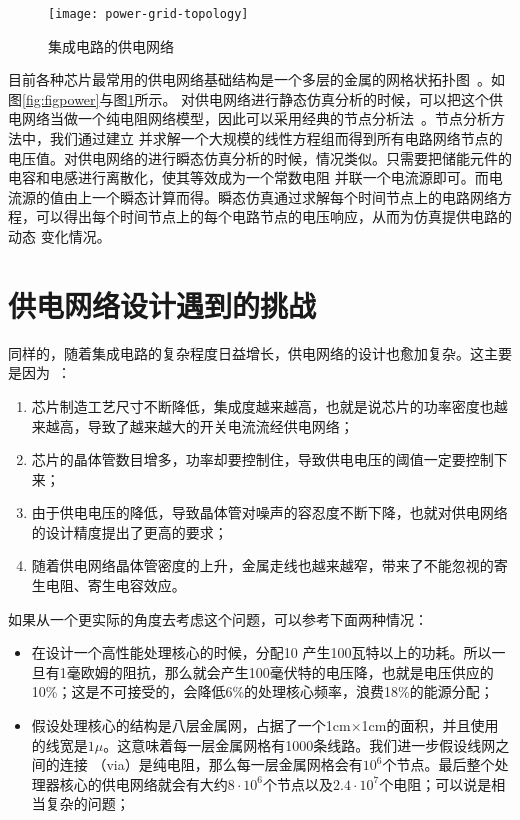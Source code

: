 \begin{figure}[H] %
  \centering
  \texttt{[image: power-grid-topology]}
  \caption{集成电路的供电网络}
  \label{fig:figtopology}
\end{figure}

目前各种芯片最常用的供电网络基础结构是一个多层的金属的网格状拓扑图~\cite{popovich2007power}。如图\ref{fig:figpower}与图\ref{fig:figtopology}所示。
对供电网络进行静态仿真分析的时候，可以把这个供电网络当做一个纯电阻网络模型，因此可以采用经典的节点分析法~\cite{vlach1983computer}。节点分析方法中，我们通过建立
并求解一个大规模的线性方程组而得到所有电路网络节点的电压值。对供电网络的进行瞬态仿真分析的时候，情况类似。只需要把储能元件的电容和电感进行离散化，使其等效成为一个常数电阻
并联一个电流源即可。而电流源的值由上一个瞬态计算而得。瞬态仿真通过求解每个时间节点上的电路网络方程，可以得出每个时间节点上的每个电路节点的电压响应，从而为仿真提供电路的动态
变化情况。


\section{供电网络设计遇到的挑战}

同样的，随着集成电路的复杂程度日益增长，供电网络的设计也愈加复杂。这主要是因为~\cite{zhu2004power}：
\begin{enumerate}
    \item 芯片制造工艺尺寸不断降低，集成度越来越高，也就是说芯片的功率密度也越来越高，导致了越来越大的开关电流流经供电网络；
    \item 芯片的晶体管数目增多，功率却要控制住，导致供电电压的阈值一定要控制下来；
    \item 由于供电电压的降低，导致晶体管对噪声的容忍度不断下降，也就对供电网络的设计精度提出了更高的要求；
    \item 随着供电网络晶体管密度的上升，金属走线也越来越窄，带来了不能忽视的寄生电阻、寄生电容效应。
\end{enumerate}

如果从一个更实际的角度去考虑这个问题，可以参考下面两种情况：

\begin{itemize}
\item 在设计一个高性能处理核心的时候，分配10%
产生100瓦特以上的功耗。所以一旦有1毫欧姆的阻抗，那么就会产生100毫伏特的电压降，也就是电压供应的10\%；这是不可接受的，会降低6\%的处理核心频率，浪费18\%的能源分配；
\item 假设处理核心的结构是八层金属网，占据了一个1cm$\times$1cm的面积，并且使用的线宽是$1\mu$。这意味着每一层金属网格有1000条线路。我们进一步假设线网之间的连接
（via）是纯电阻，那么每一层金属网格会有$10^6$个节点。最后整个处理器核心的供电网络就会有大约$8\cdot 10^6$个节点以及$2.4\cdot 10^7$个电阻；可以说是相当复杂的问题；
\end{itemize}

